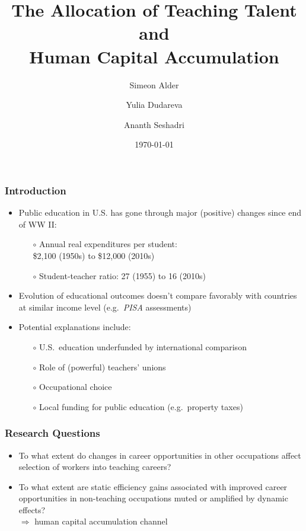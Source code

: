 \documentclass[11pt]{beamer}
\title{The Allocation of Teaching Talent and \\Human Capital Accumulation}
\author[shortname]{Simeon Alder\inst{1} \and Yulia Dudareva\inst{2} \and Ananth Seshadri\inst{1}}
\institute[shortinst]{\inst{1} University of Wisconsin--Madison \and \inst{2} University of Stavanger Business School}
\date{\today}
\begin{document}
	
	\begin{frame}
		\titlepage
	\end{frame}
	
	\begin{frame}
		\frametitle{Introduction}
		\vfill
		\begin{itemize}
			\item Public education in U.S. has gone through major (positive) changes since end of WW II:
			\begin{itemize}
				\item[$\circ$] Annual real expenditures per student: \\
				\$2,100 (1950s) to \$12,000 (2010s)
				\item[$\circ$] Student-teacher ratio: 27 (1955) to 16 (2010s)
			\end{itemize}
			\vfill
			\item Evolution of educational outcomes doesn't compare favorably with countries at similar income level (e.g.~{\it PISA} assessments)
			\vfill
			\item Potential explanations include:
			\begin{itemize}
				\item[$\circ$] U.S.~education underfunded by international comparison
				\item[$\circ$] Role of (powerful) teachers' unions \pause
				\item[$\circ$] \alert{Occupational choice} \pause
				\item[$\circ$] Local funding for public education (e.g.~property taxes)
			\end{itemize}
		\end{itemize}
		\vfill
	\end{frame}
	
	\begin{frame}
		\frametitle{Research Questions}
		\vfill
		\begin{itemize}
			\item To what extent do changes in career opportunities in other occupations affect selection of workers into teaching careers?
			\vfill
			\item To what extent are static efficiency gains associated with improved career opportunities in non-teaching occupations muted or amplified by dynamic effects?\\
			$\Rightarrow$ human capital accumulation channel
		\end{itemize}
		\vfill
	\end{frame}
	
\end{document}
